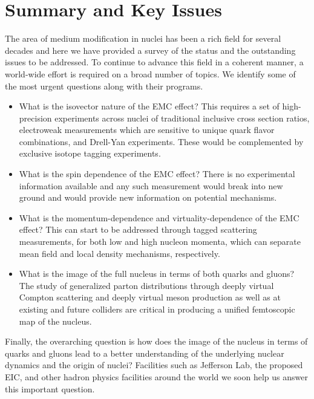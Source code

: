 \section{Summary and Key Issues\label{sec:conclusion}}
%
The area of medium modification in nuclei has been a rich field for several decades and here we have provided a survey of the status and the outstanding issues to be addressed.  To continue to advance this field in a coherent manner, a world-wide effort is required on a broad number of topics.  We identify some of the most urgent questions along with their programs.
%
\begin{itemize}
%
\item What is the isovector nature of the EMC effect?  This requires a set of high-precision experiments across nuclei of traditional inclusive cross section ratios, electroweak measurements which are sensitive to unique quark flavor combinations, and Drell-Yan experiments.  These would be complemented by exclusive isotope tagging experiments.
%
\item What is the spin dependence of the EMC effect?  There is no experimental information available and any such measurement would break into new ground and would provide new information on potential mechanisms.
%
\item What is the momentum-dependence and virtuality-dependence of the EMC effect?  This can start to be addressed through tagged scattering measurements, for both low and high nucleon momenta, which can separate mean field and local density mechanisms, respectively.
%
\item What is the image of the full nucleus in terms of both quarks and gluons?  The study of generalized parton distributions through deeply virtual Compton scattering and deeply virtual meson production as well as at existing and future colliders are critical in producing a unified femtoscopic map of the nucleus.
%
\end{itemize}
%
Finally, the overarching question is how does the image of the nucleus in terms of quarks and gluons lead to a better understanding of the underlying nuclear dynamics and the origin of nuclei? Facilities such as Jefferson Lab, the proposed EIC, and other hadron physics facilities around the world we soon help us answer this important question.

